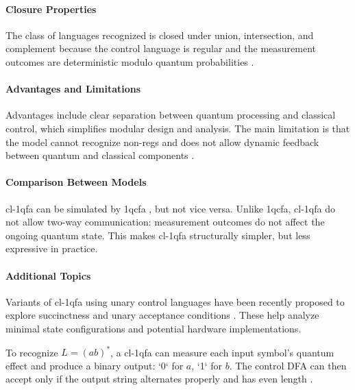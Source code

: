 \paragraph{Closure Properties}  
The class of languages recognized is closed under union, intersection, and complement because the control language is regular and the measurement outcomes are deterministic modulo quantum probabilities \cite{li2015hybrid}.

\paragraph{Advantages and Limitations}  
Advantages include clear separation between quantum processing and classical control, which simplifies modular design and analysis. The main limitation is that the model cannot recognize non-\glspl{reg} and does not allow dynamic feedback between quantum and classical components \cite{li2015hybrid}.

\paragraph{Comparison Between Models}  
\gls{cl-1qfa} can be simulated by \gls{1qcfa} \cite{li2015hybrid}, but not vice versa. Unlike \gls{1qcfa}, \gls{cl-1qfa} do not allow two-way communication: measurement outcomes do not affect the ongoing quantum state. This makes \gls{cl-1qfa} structurally simpler, but less expressive in practice.

\paragraph{Additional Topics}  
Variants of \gls{cl-1qfa} using unary control languages have been recently proposed to explore succinctness and unary acceptance conditions \cite{mereghetti2024unary}. These help analyze minimal state configurations and potential hardware implementations.

\begin{example} 
To recognize $L = (ab)^*$, a \gls{cl-1qfa} can measure each input symbol's quantum effect and produce a binary output: `0` for $a$, `1` for $b$. The control DFA can then accept only if the output string alternates properly and has even length \cite{mereghetti2006quantum}.
\end{example}

\subsubsection{}

